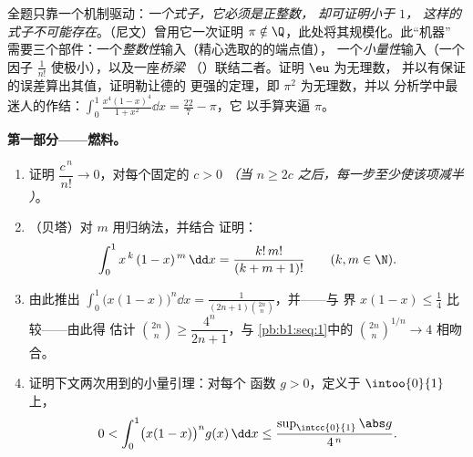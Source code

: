 \begin{problem}
\label{pb:b1:integration:1}
全题只靠一个机制驱动：\emph{一个式子，它必须是正整数，
却可证明小于 $1$，
这样的式子不可能存在}。（尼文）曾用它一次证明
$\pi \notin \Q$，此处将其规模化。此“机器”
需要三个部件：一个\emph{整数性}输入（精心选取的的端点值），
一个\emph{小量性}输入（一个因子
$\frac{1}{n!}$ 使极小），以及一座\emph{桥梁}
（）联结二者。证明 $\eu$ 为无理数，
并以有保证的误差算出其值，证明勒让德的
更强的定理，即 $\pi^2$ 为无理数，并以
分析学中最迷人的作结：$\int_0^1 \frac{x^4(1 -
x)^4}{1 + x^2}\dd x = \frac{22}{7} - \pi$，它
以手算夹逼 $\pi$。

\medskip
\noindent\textbf{第一部分——燃料。}
\begin{enumerate}
  \item 证明 $\dfrac{c^{\,n}}{n!} \to 0$，对每个固定的 $c
        > 0$ \emph{（当 $n \geq 2c$ 之后，每一步至少使该项减半
        ）}。
  \item （贝塔）对 $m$ 用归纳法，并结合
        证明：
        \[
        \int_0^1 x^{\,k}\,(1 - x)^{\,m}\,\dd x =
        \frac{k!\,m!}{(k + m + 1)!}
        \qquad (k, m \in \N).
        \]
  \item 由此推出 $\displaystyle\int_0^1 \bigl(x(1-x)\bigr)^n \dd x
        = \frac{1}{(2n+1)\binom{2n}{n}}$，并——与
        界 $x(1 - x) \leq \frac14$ 比较——由此得
        估计 $\binom{2n}{n} \geq \dfrac{4^n}{2n+1}$，与
        \cref{pb:b1:seq:1}中的 $\binom{2n}{n}^{1/n} \to 4$ 相吻合。
  \item 证明下文两次用到的小量引理：对每个
        函数 $g > 0$，定义于 $\intoo{0}{1}$ 上，
        \[
        0 < \int_0^1 \bigl(x(1-x)\bigr)^n g(x)\,\dd x
        \leq \frac{\sup_{\intcc{0}{1}}\abs g}{4^{\,n}} .
        \]
\end{enumerate}


\end{problem}
